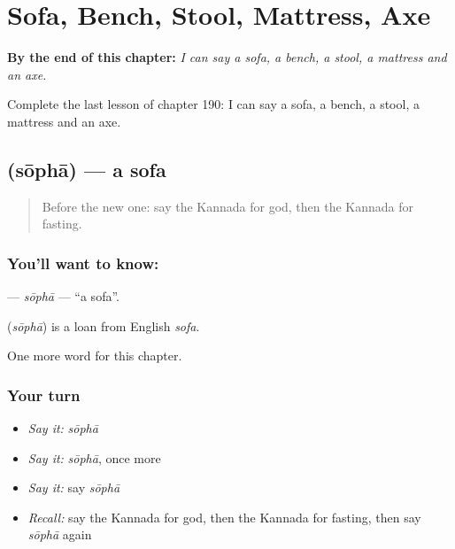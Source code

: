
\chapter{Sofa, Bench, Stool, Mattress, Axe}
\label{ch:ka-sofa-bench-stool-mattress-axe}

\begin{chapteropening}
\textbf{By the end of this chapter:} \emph{I can say a sofa, a bench, a stool, a mattress and an axe.}

Complete the last lesson of chapter 190: I can say a sofa, a bench, a stool, a mattress and an axe.
\end{chapteropening}

\section[\texorpdfstring{\kn{ಸೋಫಾ} (sōphā)}{ಸೋಫಾ (sōphā)}]{ (sōphā) — a sofa}

\label{lesson:KA-C190-sopha}



\begin{quote}
Before the new one: say the Kannada for god, then the Kannada for fasting.
\end{quote}

\subsection*{You'll want to know: }
\textbf{} — \emph{sōphā} — \textquotedblleft{}a sofa\textquotedblright{}.

\begin{cousinweb}
\textbf{} (\emph{sōphā}) is a loan from English \emph{sofa}.
\end{cousinweb}

\begin{grammarlens}[title={What you've built}]
One more word for this chapter.
\end{grammarlens}

\subsection*{Your turn}
\begin{itemize}
\raggedright
  \item \emph{Say it:} \emph{sōphā}
  \item \emph{Say it:} \emph{sōphā}, once more
  \item \emph{Say it:} say \emph{sōphā}
  \item \emph{Recall:} say the Kannada for god, then the Kannada for fasting, then say \emph{sōphā} again
\end{itemize}

